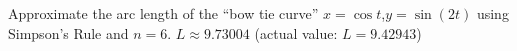 {Approximate the arc length of the ``bow tie curve'' $x=\cos t$,\quad  $y=\sin (2t)$ using Simpson's Rule and $n=6$.}
{$L\approx 9.73004$ (actual value: $L=9.42943$) }
